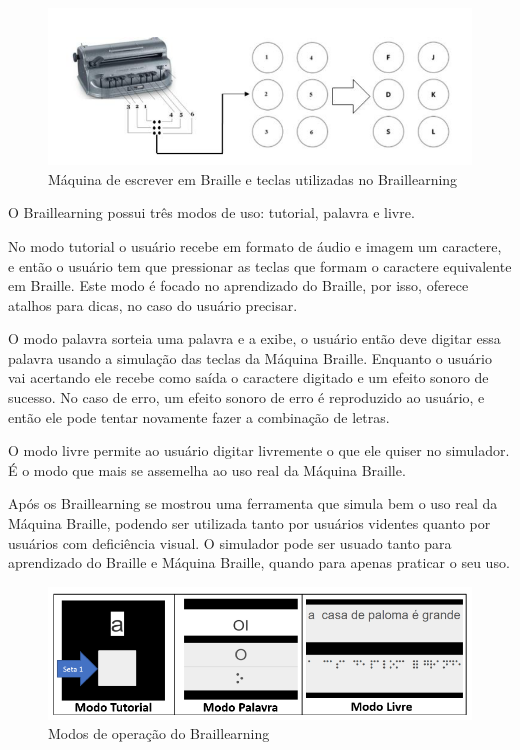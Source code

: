 \begin{figure}[h]
    \centering
    \includegraphics[scale=0.5]{ch02/assets/braillearning-keys.png}
    \decoRule
    \caption[Teclas do Braillearning]{Máquina de escrever em Braille e teclas utilizadas no Braillearning \parencite{REF08}}
    \label{fig:ch02-braillearning-modes}
\end{figure}

O Braillearning possui três modos de uso: tutorial, palavra e livre.

No modo tutorial o usuário recebe em formato de áudio e imagem um caractere, e então o usuário tem que pressionar as teclas que formam o caractere equivalente em Braille. Este modo é focado no aprendizado do Braille, por isso, oferece atalhos para dicas, no caso do usuário precisar.

O modo palavra sorteia uma palavra e a exibe, o usuário então deve digitar essa palavra usando a simulação das teclas da Máquina Braille. Enquanto o usuário vai acertando ele recebe como saída o caractere digitado e um efeito sonoro de sucesso. No caso de erro, um efeito sonoro de erro é reproduzido ao usuário, e então ele pode tentar novamente fazer a combinação de letras.

O modo livre permite ao usuário digitar livremente o que ele quiser no simulador. É o modo que mais se assemelha ao uso real da Máquina Braille.

Após os Braillearning se mostrou uma ferramenta que simula bem o uso real da Máquina Braille, podendo ser utilizada tanto por usuários videntes quanto por usuários com deficiência visual. O simulador pode ser usuado tanto para aprendizado do Braille e Máquina Braille, quando para apenas praticar o seu uso.

\begin{figure}[h]
    \centering
    \includegraphics[scale=0.5]{ch02/assets/braillearning-modes.png}
    \decoRule
    \caption[Modos do Braillearning]{Modos de operação do Braillearning \parencite{REF08}}
    \label{fig:ch02-braillearning-modes}
\end{figure}

